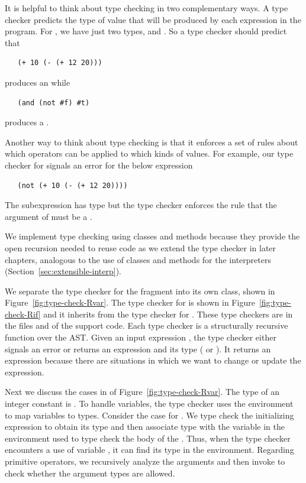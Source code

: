 \documentclass[11pt]{book}
\begin{document}
It is helpful to think about type checking in two complementary
ways. A type checker predicts the type of value that will be produced
by each expression in the program.  For \LangIf{}, we have just two types,
 and . So a type checker should predict that
\begin{lstlisting}
   (+ 10 (- (+ 12 20)))
\end{lstlisting}
produces an  while
\begin{lstlisting}
   (and (not #f) #t)
\end{lstlisting}
produces a .

Another way to think about type checking is that it enforces a set of
rules about which operators can be applied to which kinds of
values. For example, our type checker for \LangIf{} signals an error
for the below expression
\begin{lstlisting}
   (not (+ 10 (- (+ 12 20))))
\end{lstlisting}
The subexpression  has type 
but the type checker enforces the rule that the argument of 
must be a .

We implement type checking using classes and methods because they
provide the open recursion needed to reuse code as we extend the type
checker in later chapters, analogous to the use of classes and methods
for the interpreters (Section~\ref{sec:extensible-interp}).

We separate the type checker for the \LangVar{} fragment into its own
class, shown in Figure~\ref{fig:type-check-Rvar}. The type checker for
\LangIf{} is shown in Figure~\ref{fig:type-check-Rif} and it inherits
from the type checker for \LangVar{}. These type checkers are in the
files  and  of the
support code.
%
Each type checker is a structurally recursive function over the AST.
Given an input expression , the type checker either signals an
error or returns an expression and its type ( or
). It returns an expression because there are situations
in which we want to change or update the expression.

Next we discuss the  cases in  of
Figure~\ref{fig:type-check-Rvar}.  The type of an integer constant is
.  To handle variables, the type checker uses the
environment  to map variables to types. Consider the case
for .  We type check the initializing expression to obtain
its type  and then associate type  with the variable
 in the environment used to type check the body of the
. Thus, when the type checker encounters a use of variable
, it can find its type in the environment.  Regarding
primitive operators, we recursively analyze the arguments and then
invoke  to check whether the argument types are
allowed.
\end{document}
